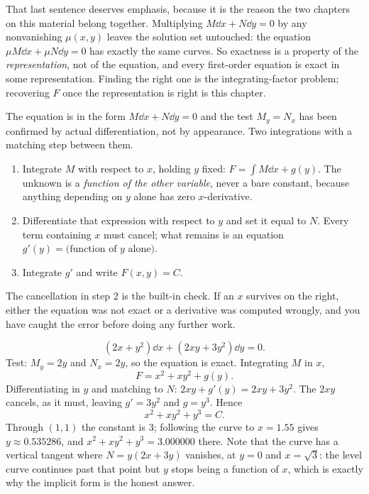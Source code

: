 That last sentence deserves emphasis, because it is the reason the two chapters on this material belong together. Multiplying $M\dd x+N\dd y=0$ by any nonvanishing $\mu(x,y)$ leaves the solution set untouched: the equation $\mu M\dd x+\mu N\dd y=0$ has exactly the same curves. So exactness is a property of the \emph{representation}, not of the equation, and every first-order equation is exact in some representation. Finding the right one is the integrating-factor problem; recovering $F$ once the representation is right is this chapter.

\cue The equation is in the form $M\dd x+N\dd y=0$ and the test $M_y=N_x$ has been confirmed by actual differentiation, not by appearance.
\method Two integrations with a matching step between them.
\begin{enumerate}[label=\arabic*.]
\item Integrate $M$ with respect to $x$, holding $y$ fixed: $F=\int M\dd x+g(y)$. The unknown is a \emph{function of the other variable}, never a bare constant, because anything depending on $y$ alone has zero $x$-derivative.
\item Differentiate that expression with respect to $y$ and set it equal to $N$. Every term containing $x$ must cancel; what remains is an equation $g'(y)=\bigl(\text{function of }y\text{ alone}\bigr)$.
\item Integrate $g'$ and write $F(x,y)=C$.
\end{enumerate}
The cancellation in step 2 is the built-in check. If an $x$ survives on the right, either the equation was not exact or a derivative was computed wrongly, and you have caught the error before doing any further work.

\begin{worked}
\[(2x+y^{2})\dd x+(2xy+3y^{2})\dd y=0.\]
Test: $M_y=2y$ and $N_x=2y$, so the equation is exact. Integrating $M$ in $x$,
\[F=x^{2}+xy^{2}+g(y).\]
Differentiating in $y$ and matching to $N$: $2xy+g'(y)=2xy+3y^{2}$. The $2xy$ cancels, as it must, leaving $g'=3y^{2}$ and $g=y^{3}$. Hence
\[x^{2}+xy^{2}+y^{3}=C.\]
Through $(1,1)$ the constant is $3$; following the curve to $x=1.55$ gives $y\approx0.535286$, and $x^{2}+xy^{2}+y^{3}=3.000000$ there. Note that the curve has a vertical tangent where $N=y(2x+3y)$ vanishes, at $y=0$ and $x=\sqrt3$: the level curve continues past that point but $y$ stops being a function of $x$, which is exactly why the implicit form is the honest answer.
\end{worked}

